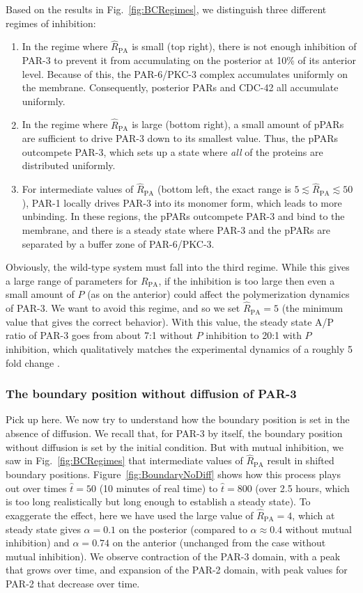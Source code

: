 \documentclass[11pt]{article}
\newcommand{\red}[1]{\color{red}#1\normalcolor}
\newcommand{\6}[1]{#1_{\text{6}}}
\newcommand{\3}[1]{#1_{\text{3}}}
\begin{document}
Based on the results in Fig.\ \ref{fig:BCRegimes}, we distinguish three different regimes of inhibition:
\begin{enumerate}
\item In the regime where $\hat R_\text{PA}$ is small (top right), there is not enough inhibition of PAR-3 to prevent it from accumulating on the posterior at 10\% of its anterior level. Because of this, the PAR-6/PKC-3 complex accumulates uniformly on the membrane. Consequently, posterior PARs and CDC-42 all accumulate uniformly. 
\item In the regime where $\hat R_\text{PA}$ is large (bottom right), a small amount of pPARs are sufficient to drive PAR-3 down to its smallest value. Thus, the pPARs outcompete PAR-3, which sets up a state where \emph{all} of the proteins are distributed uniformly. 
\item For intermediate values of $\hat R_\text{PA}$ (bottom left, the exact range is $5 \lesssim \hat R_\text{PA} \lesssim 50$), PAR-1 locally drives PAR-3 into its monomer form, which leads to more unbinding. In these regions, the pPARs outcompete PAR-3 and bind to the membrane, and there is a steady state where PAR-3 and the pPARs are separated by a buffer zone of PAR-6/PKC-3.
\end{enumerate}
Obviously, the wild-type system must fall into the third regime. While this gives a large range of parameters for $R_\text{PA}$, if the inhibition is too large then even a small amount of $P$ (as on the anterior) could affect the polymerization dynamics of PAR-3. We want to avoid this regime, and so we set $\hat R_\text{PA}=5$ (the minimum value that gives the correct behavior). With this value, the steady state A/P ratio of PAR-3 goes from about 7:1 without $P$ inhibition to 20:1 with $P$ inhibition, which qualitatively matches the experimental dynamics of a roughly 5 fold change \cite[Fig.~4c]{sailer2015dynamic}. 

\subsubsection{The boundary position without diffusion of PAR-3}
\red{Pick up here.} We now try to understand how the boundary position is set in the absence of diffusion. We recall that, for PAR-3 by itself, the boundary position without diffusion is set by the initial condition. But with mutual inhibition, we saw in Fig.\ \ref{fig:BCRegimes} that intermediate values of $\hat R_\text{PA}$ result in shifted boundary positions. Figure\ \ref{fig:BoundaryNoDiff} shows how this process plays out over times $\hat t = 50$ (10 minutes of real time) to $\hat t = 800$ (over 2.5 hours, which is too long realistically but long enough to establish a steady state). To exaggerate the effect, here we have used the large value of $\hat R_\text{PA}=4$, which at steady state gives $\alpha=0.1$ on the posterior (compared to $\alpha \approx 0.4$ without mutual inhibition) and $\alpha=0.74$ on the anterior (unchanged from the case without mutual inhibition). We observe contraction of the PAR-3 domain, with a peak that grows over time, and expansion of the PAR-2 domain, with peak values for PAR-2 that decrease over time. 
\end{document}
